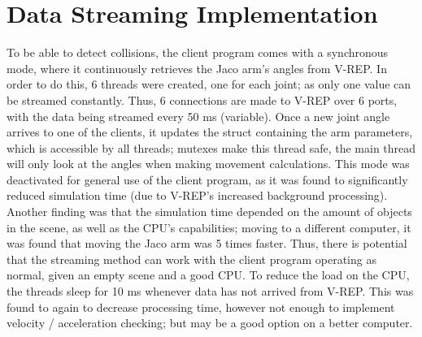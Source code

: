 \documentclass[12pt,openany,a4paper]{book}
\begin{document}
\section{Data Streaming Implementation}
To be able to detect collisions, the client program comes with a synchronous mode, where it continuously retrieves the Jaco arm's angles from V-REP. In order to do this, 6 threads were created, one for each joint; as only one value can be streamed constantly. Thus, 6 connections are made to V-REP over 6 ports, with the data being streamed every 50 ms (variable). Once a new joint angle arrives to one of the clients, it updates the struct containing the arm parameters, which is accessible by all threads; mutexes make this thread safe, the main thread will only look at the angles when making movement calculations. This mode was deactivated for general use of the client program, as it was found to significantly reduced simulation time (due to V-REP's increased background processing). Another finding was that the simulation time depended on the amount of objects in the scene, as well as the CPU's capabilities; moving to a different computer, it was found that moving the Jaco arm was 5 times faster. Thus, there is potential that the streaming method can work with the client program operating as normal, given an empty scene and a good CPU. To reduce the load on the CPU, the threads sleep for 10 ms whenever data has not arrived from V-REP. This was found to again to decrease processing time, however not enough to implement velocity / acceleration checking; but may be a good option on a better computer. 
\end{document}

